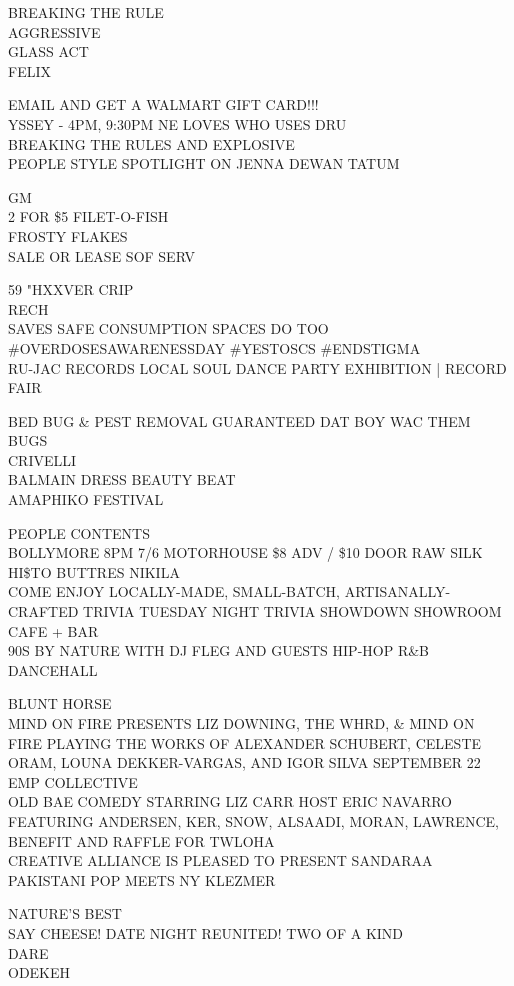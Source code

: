 \documentclass[10pt,letterpaper]{article}
\begin{document}
BREAKING THE RULE\\
AGGRESSIVE\\
GLASS ACT\\
FELIX

EMAIL AND GET A WALMART GIFT CARD!!!\\
YSSEY {-} 4PM, 9:30PM NE LOVES WHO USES DRU\\
BREAKING THE RULES AND EXPLOSIVE\\
PEOPLE STYLE SPOTLIGHT ON JENNA DEWAN TATUM

GM\\
2 FOR \$5 FILET{-}O{-}FISH\\
FROSTY FLAKES\\
SALE OR LEASE SOF SERV

59 "HXXVER CRIP\\
RECH\\
SAVES SAFE CONSUMPTION SPACES DO TOO \#OVERDOSESAWARENESSDAY \#YESTOSCS \#ENDSTIGMA\\
RU{-}JAC RECORDS LOCAL SOUL DANCE PARTY EXHIBITION | RECORD FAIR

BED BUG \& PEST REMOVAL GUARANTEED DAT BOY WAC THEM BUGS\\
CRIVELLI\\
BALMAIN DRESS BEAUTY BEAT\\
AMAPHIKO FESTIVAL

PEOPLE CONTENTS\\
BOLLYMORE 8PM 7/6 MOTORHOUSE \$8 ADV / \$10 DOOR RAW SILK HI\$TO BUTTRES NIKILA\\
COME ENJOY LOCALLY{-}MADE, SMALL{-}BATCH, ARTISANALLY{-}CRAFTED TRIVIA TUESDAY NIGHT TRIVIA SHOWDOWN SHOWROOM CAFE + BAR\\
90S BY NATURE WITH DJ FLEG AND GUESTS HIP{-}HOP R\&B DANCEHALL

BLUNT HORSE\\
MIND ON FIRE PRESENTS LIZ DOWNING, THE WHRD, \& MIND ON FIRE PLAYING THE WORKS OF ALEXANDER SCHUBERT, CELESTE ORAM, LOUNA DEKKER{-}VARGAS, AND IGOR SILVA SEPTEMBER 22 EMP COLLECTIVE\\
OLD BAE COMEDY STARRING LIZ CARR HOST ERIC NAVARRO FEATURING ANDERSEN, KER, SNOW, ALSAADI, MORAN, LAWRENCE, BENEFIT AND RAFFLE FOR TWLOHA\\
CREATIVE ALLIANCE IS PLEASED TO PRESENT SANDARAA PAKISTANI POP MEETS NY KLEZMER

NATURE'S BEST\\
SAY CHEESE!  DATE NIGHT  REUNITED!  TWO OF A KIND\\
DARE\\
ODEKEH
\end{document}
